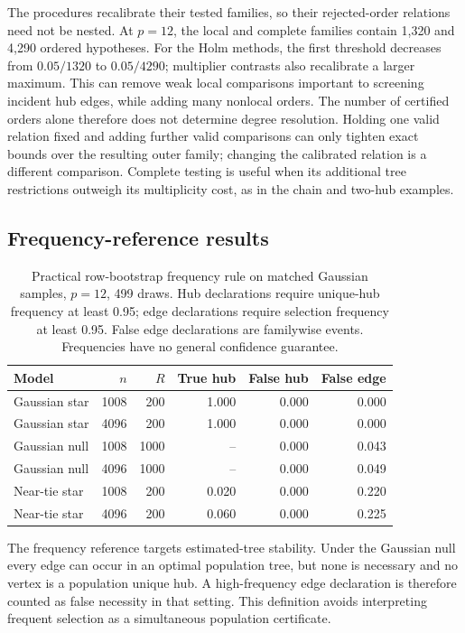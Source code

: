 The procedures recalibrate their tested families, so their rejected-order relations need not be nested. At $p=12$, the local and complete families contain 1,320 and 4,290 ordered hypotheses. For the Holm methods, the first threshold decreases from $0.05/1320$ to $0.05/4290$; multiplier contrasts also recalibrate a larger maximum. This can remove weak local comparisons important to screening incident hub edges, while adding many nonlocal orders. The number of certified orders alone therefore does not determine degree resolution. Holding one valid relation fixed and adding further valid comparisons can only tighten exact bounds over the resulting outer family; changing the calibrated relation is a different comparison. Complete testing is useful when its additional tree restrictions outweigh its multiplicity cost, as in the chain and two-hub examples.
\subsection{Frequency-reference results}
\begin{table}[H]\centering\small
\setlength{\tabcolsep}{4pt}
\caption{Practical row-bootstrap frequency rule on matched Gaussian samples, $p=12$, 499 draws. Hub declarations require unique-hub frequency at least 0.95; edge declarations require selection frequency at least 0.95. False edge declarations are familywise events. Frequencies have no general confidence guarantee.}\label{tab:frequency}
\begin{lrbox}{\resultsbox}\begin{tabular}{lrrrrr}
\toprule
Model & $n$ & $R$ & True hub & False hub & False edge\\
\midrule
Gaussian star & 1008 & 200 & 1.000 & 0.000 & 0.000\\
Gaussian star & 4096 & 200 & 1.000 & 0.000 & 0.000\\
Gaussian null & 1008 & 1000 & -- & 0.000 & 0.043\\
Gaussian null & 4096 & 1000 & -- & 0.000 & 0.049\\
Near-tie star & 1008 & 200 & 0.020 & 0.000 & 0.220\\
Near-tie star & 4096 & 200 & 0.060 & 0.000 & 0.225\\
\bottomrule\end{tabular}\end{lrbox}\ifdim\wd\resultsbox>\linewidth\resizebox{\linewidth}{!}{\usebox{\resultsbox}}\else\usebox{\resultsbox}\fi\end{table}
The frequency reference targets estimated-tree stability. Under the Gaussian null every edge can occur in an optimal population tree, but none is necessary and no vertex is a population unique hub. A high-frequency edge declaration is therefore counted as false necessity in that setting. This definition avoids interpreting frequent selection as a simultaneous population certificate.
